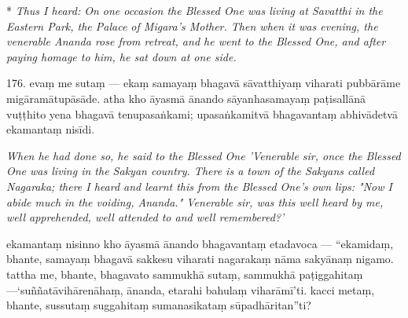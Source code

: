 \documentclass[12pt]{article}
\begin{document}
\begin{paracol}{2}
	\begin{column}*
{\itshape\footnotesize Thus I heard: On one occasion the Blessed One was living at Savatthi in the Eastern Park, the Palace of Migara's Mother. Then when it was evening, the venerable Ananda rose from retreat, and he went to the Blessed One, and after paying homage to him, he sat down at one side.}
\switchcolumn
	\begin{flushleft}
 176. evaṃ me sutaṃ — ekaṃ samayaṃ bhagavā sāvatthiyaṃ viharati pubbārāme migāramātupāsāde. atha kho āyasmā ānando sāyanhasamayaṃ paṭisallānā vuṭṭhito yena bhagavā tenupasaṅkami; upasaṅkamitvā bhagavantaṃ abhivādetvā ekamantaṃ nisīdi.
 	
 \switchcolumn*
 \end{flushleft}
{\itshape\footnotesize When he had done so, he said to the Blessed One 'Venerable sir, once the Blessed One was living in the Sakyan country. There is a town of the Sakyans called Nagaraka; there I heard and learnt this from the Blessed One's own lips: "Now I abide much in the voiding, Ananda." Venerable sir, was this well heard by me, well apprehended, well attended to and well remembered?'}
\switchcolumn
	\begin{flushleft}
ekamantaṃ nisinno kho āyasmā ānando bhagavantaṃ etadavoca — “ekamidaṃ, bhante, samayaṃ bhagavā sakkesu viharati nagarakaṃ nāma sakyānaṃ nigamo. tattha me, bhante, bhagavato sammukhā sutaṃ, sammukhā paṭiggahitaṃ —‘suññatāvihārenāhaṃ, ānanda, etarahi bahulaṃ viharāmī’ti. kacci metaṃ, bhante, sussutaṃ suggahitaṃ sumanasikataṃ sūpadhāritan”ti?
\switchcolumn*
	\end{flushleft}

\end{column}
\end{paracol}
\end{document}
